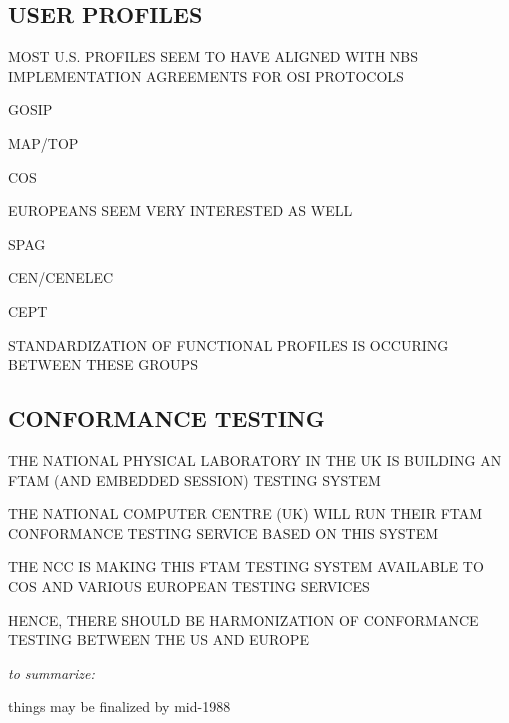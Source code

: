 \begin{bwslide}
\part*	{USER PROFILES}\bf

\begin{nrtc}
\item	MOST U.S. PROFILES SEEM TO HAVE ALIGNED WITH
	NBS IMPLEMENTATION AGREEMENTS FOR OSI PROTOCOLS
    \begin{nrtc}
    \item	GOSIP

    \item	MAP/TOP

    \item	COS
    \end{nrtc}

\item	EUROPEANS SEEM VERY INTERESTED AS WELL
    \begin{nrtc}
    \item	SPAG

    \item	CEN/CENELEC

    \item	CEPT
    \end{nrtc}

\item	STANDARDIZATION OF FUNCTIONAL PROFILES IS OCCURING BETWEEN THESE
	GROUPS
\end{nrtc}
\end{bwslide}


\begin{bwslide}
\part*	{CONFORMANCE TESTING}\bf

\begin{nrtc}
\item	THE NATIONAL PHYSICAL LABORATORY IN THE UK IS BUILDING AN
	FTAM (AND EMBEDDED SESSION) TESTING SYSTEM

\item	THE NATIONAL COMPUTER CENTRE (UK) WILL RUN THEIR FTAM CONFORMANCE
	TESTING SERVICE BASED ON THIS SYSTEM

\item	THE NCC IS MAKING THIS FTAM TESTING SYSTEM AVAILABLE TO COS AND
	VARIOUS EUROPEAN TESTING SERVICES

\item	HENCE, THERE SHOULD BE HARMONIZATION OF CONFORMANCE TESTING BETWEEN
	THE US AND EUROPE
\end{nrtc}
\end{bwslide}


\begin{note}\em
to summarize:

things may be finalized by mid-1988
\end{note}
